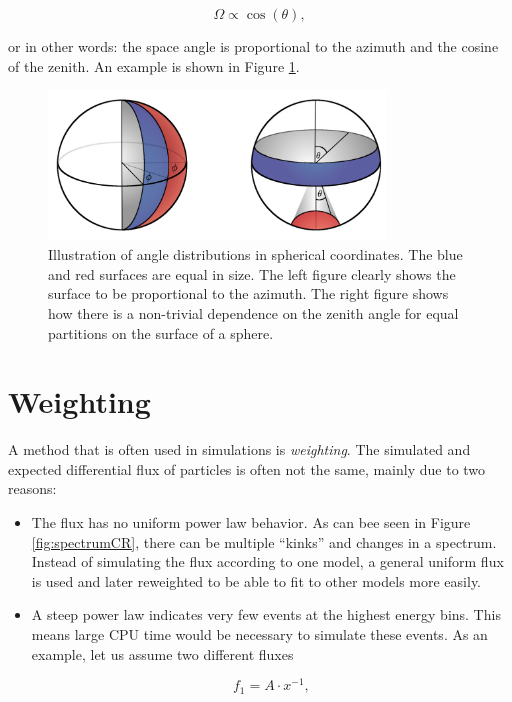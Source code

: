 \begin{appendices}
\begin{equation}
\Omega \propto \cos(\theta),
\end{equation}

\noindent or in other words: the space angle is proportional to the azimuth and the cosine of the zenith. An example is shown in Figure \ref{fig:spaceangle}.

\begin{figure}
\centering
\includegraphics[width = 0.8\textwidth]{appendix/img/spaceangle.png}
\caption{Illustration of angle distributions in spherical coordinates. The blue and red surfaces are equal in size. The left figure clearly shows the surface to be proportional to the azimuth. The right figure shows how there is a non-trivial dependence on the zenith angle for equal partitions on the surface of a sphere.}
\label{fig:spaceangle}
\end{figure}

\section{Weighting}
\label{sec:weighting}
A method that is often used in simulations is \textit{weighting}. The simulated and expected differential flux of particles is often not the same, mainly due to two reasons:

\begin{itemize}
\item The flux has no uniform power law behavior. As can bee seen in Figure \ref{fig:spectrumCR}, there can be multiple ``kinks'' and changes in a spectrum. Instead of simulating the flux according to one model, a general uniform flux is used and later reweighted to be able to fit to other models more easily.
\item A steep power law indicates very few events at the highest energy bins. This means large CPU time would be necessary to simulate these events. As an example, let us assume two different fluxes

\begin{equation}
f_1 = A \cdot x^{-1},
\end{equation}


\end{itemize}
\end{appendices}
